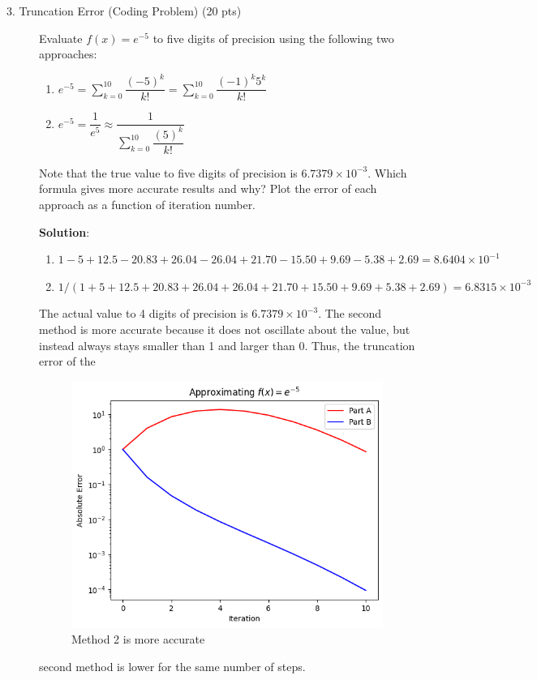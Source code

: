 \documentclass[12pt]{article}
\newcommand{\ds}{\displaystyle}
\begin{document}
\begin{description}
\item[3. Truncation Error \color{red} (Coding Problem) \color{black} (20 pts)] Evaluate $f (x) = e^{-5}$ to five digits of precision using the following two approaches:
    \begin{enumerate}[label=\textbf{(\alph*)}]
    \item $e^{-5} = \ds\sum^{10}_{k = 0} \dfrac{(-5)^k}{k!} = \ds\sum^{10}_{k = 0} \dfrac{(-1)^k 5^k}{k!}$
    \item $e^{-5} = \dfrac{1}{e^5} \approx \dfrac{1}{\ds\sum^{10}_{k = 0} \dfrac{(5)^k}{k!}}$
    \end{enumerate}
    Note that the true value to five digits of precision is $6.7379 \times 10^{-3}$. Which formula gives more accurate results and why? Plot the error of each approach as a function of iteration number.

    \color{red}
    \ifsolution
    {\bf Solution}:
    \begin{enumerate}[label=\textbf{(\alph*)}]
    \item $1-5+12.5-20.83+26.04-26.04+21.70-15.50+9.69-5.38+2.69 = 8.6404 \times 10^{-1}$ 
    \item $1/(1+5+12.5+20.83+26.04+26.04+21.70+15.50+9.69+5.38+2.69)  = 6.8315 \times 10^{-3}$
    \end{enumerate}
    The actual value to 4 digits of precision is $6.7379 \times 10^{-3}$. The second method is more accurate because it does not oscillate about the value, but instead always stays smaller than 1 and larger than 0. Thus, the truncation error of the     \begin{figure}[h!]
	\centering\includegraphics[width=4.5in]{HW1Fig2.png}
	\caption{Method 2 is more accurate}
	\label{fig:truncationError}
\end{figure}second method is lower for the same number of steps.
    

\end{description}
\end{document}
